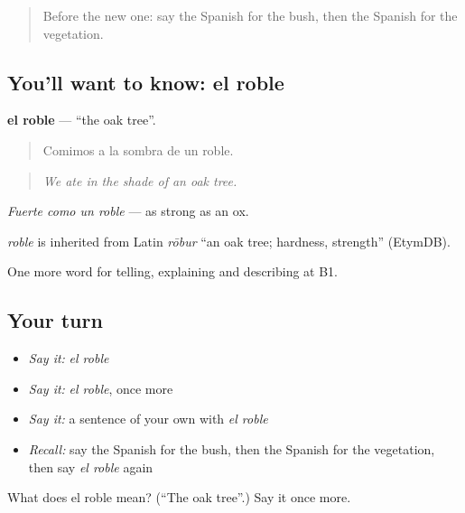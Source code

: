 \label{lesson:ES-C693-roble}



\begin{quote}
Before the new one: say the Spanish for the bush, then the Spanish for the vegetation.
\end{quote}

\subsection*{You'll want to know: el roble}
\textbf{el roble} — \textquotedblleft{}the oak tree\textquotedblright{}.

\begin{quote}
Comimos a la sombra de un roble.
\end{quote}

\begin{quote}
\emph{We ate in the shade of an oak tree.}
\end{quote}

\emph{Fuerte como un roble} — as strong as an ox.

\begin{cousinweb}
\emph{roble} is inherited from Latin \emph{rōbur} \textquotedblleft{}an oak tree; hardness, strength\textquotedblright{} (EtymDB).
\end{cousinweb}

\begin{grammarlens}[title={What you've built}]
One more word for telling, explaining and describing at B1.
\end{grammarlens}

\subsection*{Your turn}
\begin{itemize}
\raggedright
  \item \emph{Say it:} \emph{el roble}
  \item \emph{Say it:} \emph{el roble}, once more
  \item \emph{Say it:} a sentence of your own with \emph{el roble}
  \item \emph{Recall:} say the Spanish for the bush, then the Spanish for the vegetation, then say \emph{el roble} again
\end{itemize}

\begin{tcolorbox}[breakable,colback=teal!4,colframe=teal!35!black,title={Before you move on}]
What does el roble mean? (\textquotedblleft{}The oak tree\textquotedblright{}.) Say it once more.
\end{tcolorbox}
